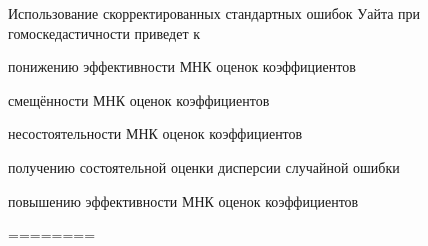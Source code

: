 
\begin{question}
Использование скорректированных стандартных ошибок Уайта при
гомоскедастичности приведет к
\begin{answerlist}
  \item понижению эффективности МНК оценок коэффициентов
  \item смещённости МНК оценок коэффициентов
  \item несостоятельности МНК оценок коэффициентов
  \item получению состоятельной оценки дисперсии случайной ошибки
  \item повышению эффективности МНК оценок коэффициентов
\end{answerlist}
\end{question}

\begin{solution}
========
\end{solution}

